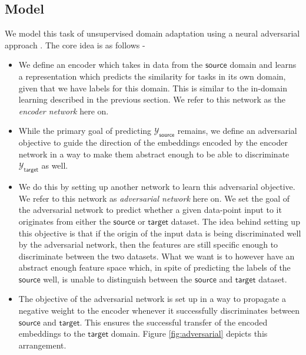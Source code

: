 \documentclass{sigkddExp}
\begin{document}
\subsection{Model}
We model this task of unsupervised domain adaptation using a neural adversarial approach \cite{ganin2015unsupervised}. The core idea is as follows - 
\begin{itemize}[topsep=0pt,itemsep=-1ex,partopsep=1ex,parsep=1ex]
    \item We define an encoder which takes in data from the $\mathsf{source}$ domain and learns a representation which predicts the similarity for tasks in its own domain, given that we have labels for this domain. This is similar to the in-domain learning described in the previous section. We refer to this network as the \textit{encoder network} here on.
    \item While the primary goal of predicting $\mathcal{Y}_\mathsf{source}$ remains, we define an adversarial objective to guide the direction of the embeddings encoded by the encoder network in a way to make them abstract enough to be able to discriminate $\mathcal{Y}_\mathsf{target}$ as well.
    
    \item We do this by setting up another network to learn this adversarial objective. We refer to this network as \textit{adversarial network} here on. We set the goal of the adversarial network to predict whether a given data-point input to it originates from either the $\mathsf{source}$ or $\mathsf{target}$ dataset. The idea behind setting up this objective is that if the origin of the input data is being discriminated well by the adversarial network, then the features are still specific enough to discriminate between the two datasets. What we want is to however have an abstract enough feature space which, in spite of predicting the labels of the $\mathsf{source}$ well, is unable to distinguish between the $\mathsf{source}$ and $\mathsf{target}$ dataset.
    \item The objective of the adversarial network is set up in a way to propagate a negative weight to the encoder whenever it successfully discriminates between $\mathsf{source}$ and $\mathsf{target}$. This ensures the successful transfer of the encoded embeddings to the $\mathsf{target}$ domain. Figure \ref{fig:adversarial} depicts this arrangement.
    

\end{itemize}
\end{document}
